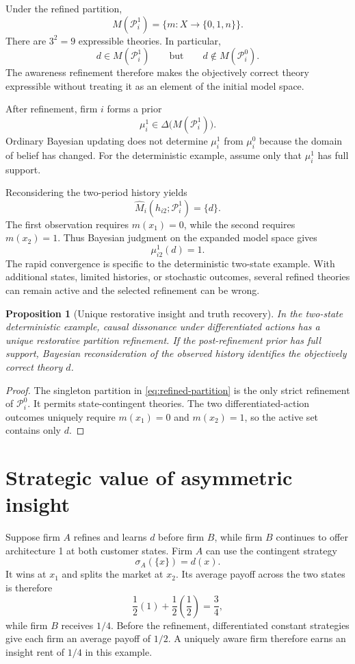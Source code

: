 \documentclass[11pt]{article}
\newtheorem{proposition}{Proposition}
\begin{document}
Under the refined partition,
\[
M(\mathcal P_i^1)
=
\{m:X\to\{0,1,n\}\}.
\]
There are $3^2=9$ expressible theories.  In particular,
\[
d\in M(\mathcal P_i^1)
\qquad\text{but}\qquad
d\notin M(\mathcal P_i^0).
\]
The awareness refinement therefore makes the objectively correct theory expressible without treating it as an element of the initial model space.

After refinement, firm $i$ forms a prior
\[
\mu_i^1\in\Delta\big(M(\mathcal P_i^1)\big).
\]
Ordinary Bayesian updating does not determine $\mu_i^1$ from $\mu_i^0$ because the domain of belief has changed.  For the deterministic example, assume only that $\mu_i^1$ has full support.

Reconsidering the two-period history yields
\[
\widehat M_i(h_{i2};\mathcal P_i^1)=\{d\}.
\]
The first observation requires $m(x_1)=0$, while the second requires $m(x_2)=1$.  Thus Bayesian judgment on the expanded model space gives
\[
\mu_{i2}^1(d)=1.
\]
The rapid convergence is specific to the deterministic two-state example.  With additional states, limited histories, or stochastic outcomes, several refined theories can remain active and the selected refinement can be wrong.

\begin{proposition}[Unique restorative insight and truth recovery]
In the two-state deterministic example, causal dissonance under differentiated actions has a unique restorative partition refinement.  If the post-refinement prior has full support, Bayesian reconsideration of the observed history identifies the objectively correct theory $d$.
\end{proposition}

\begin{proof}
The singleton partition in \eqref{eq:refined-partition} is the only strict refinement of $\mathcal P_i^0$.  It permits state-contingent theories.  The two differentiated-action outcomes uniquely require $m(x_1)=0$ and $m(x_2)=1$, so the active set contains only $d$.
\end{proof}

\section{Strategic value of asymmetric insight}

Suppose firm $A$ refines and learns $d$ before firm $B$, while firm $B$ continues to offer architecture 1 at both customer states.  Firm $A$ can use the contingent strategy
\[
\sigma_A(\{x\})=d(x).
\]
It wins at $x_1$ and splits the market at $x_2$.  Its average payoff across the two states is therefore
\[
\frac12(1)+\frac12\left(\frac12\right)=\frac34,
\]
while firm $B$ receives $1/4$.  Before the refinement, differentiated constant strategies give each firm an average payoff of $1/2$.  A uniquely aware firm therefore earns an insight rent of $1/4$ in this example.
\end{document}
